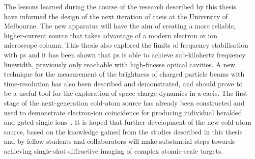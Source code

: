 The lessons learned during the course of the research described by this thesis have informed the design of the next iteration of \gls{caeis} at the University of Melbourne.
The new apparatus will have the aim of creating a more reliable, higher-current source that takes advantage of a modern electron or ion microscope column.
This thesis also explored the limits of frequency stabilisation with \gls{ps} and it has been shown that \gls{ps} is able to achieve sub-kilohertz frequency linewidth, previously only reachable with high-finesse optical cavities.
A new technique for the measurement of the brightness of charged particle beams with time-resolution has also been described and demonstrated, and should prove to be a useful tool for the exploration of space-charge dynamics in a \gls{caeis}.
The first stage of the next-generation cold-atom source has already been constructed and used to demonstrate electron-ion coincidence for producing individual heralded and gated single ions~\cite{mcculloch_heralded_2018}.
It is hoped that further development of the new cold-atom source, based on the knowledge gained from the studies described in this thesis and by fellow students and collaborators will make substantial steps towards achieving single-shot diffractive imaging of complex atomic-scale targets.